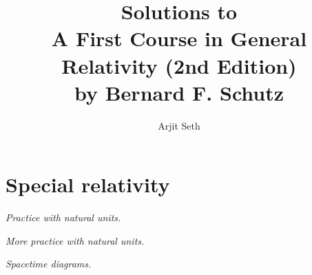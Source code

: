 \documentclass{report}
\begin{document}
\title{Solutions to \\A First Course in General Relativity (2nd Edition)\\ by Bernard F. Schutz}

\author{Arjit Seth}
\date{}

\maketitle

\chapter{Special relativity}

\begin{subquests}
	\item \emph{Practice with natural units.}
	\begin{subquests}
		\item

		\item

		\item

		\item

		\item

		\item

		\item

		\item		
	\end{subquests}

	\item \emph{More practice with natural units.}
	\begin{subquests}
		\item

		\item

		\item

		\item

		\item
	\end{subquests}

	\item \emph{Spacetime diagrams.}
	\begin{subquests}
		\item

		\item


\end{subquests}
\end{subquests}
\end{document}
